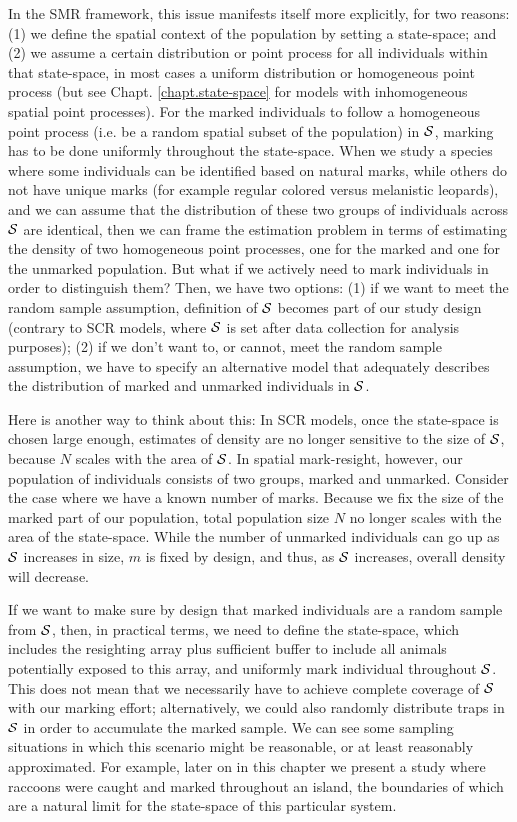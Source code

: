 In the SMR framework, this issue manifests itself more explicitly, for
two reasons: (1) we define the spatial context of the population by
setting a state-space; and (2) we assume a certain distribution or
point process for all individuals within that state-space, in most
cases a uniform distribution or homogeneous point process (but see
Chapt. \ref{chapt.state-space} for models with inhomogeneous spatial
point processes). For the marked individuals to follow a homogeneous point process (i.e. be a random spatial
subset 
of the population) in ${\cal S}$, marking has to be done uniformly throughout the state-space. 
When we study a species where some
individuals can be identified based on natural marks, while others do
not have unique marks (for example regular colored versus melanistic
leopards), and we can assume that the distribution of these two groups
of individuals across ${\cal S}$ are identical, then we can frame the
estimation problem in terms of estimating the density of two
homogeneous point processes, one for the marked and one for the unmarked
population.
But what if we actively need to mark
individuals in order to distinguish them?  Then, we have two options: (1) if we want to meet
the random sample assumption, definition of ${\cal S}$ becomes
part of our study design (contrary to SCR models, where ${\cal S}$ is set after data collection for analysis
purposes); (2) if we don't want to, or cannot, meet the random sample assumption, we have to specify an alternative model that adequately describes the distribution of marked and unmarked individuals in ${\cal S}$.

Here is another way to think about this: In SCR models, once the
state-space is chosen large enough, estimates of density are no longer
sensitive to the size of ${\cal S}$, because $N$ scales with the area
of ${\cal S}$. In spatial mark-resight, however, our population of
individuals consists of two groups, marked and unmarked. Consider the
case where we have a known number of marks. Because we fix the size of
the marked part of our population, total population size $N$ no longer
scales with the area of the state-space. While the number of unmarked
individuals can go up as ${\cal S}$ increases in size, $m$ is fixed by
design, and thus, as ${\cal S}$ increases, overall density will
decrease. 

If we want to make sure by design that marked individuals are a
random sample from ${\cal S}$, then, in practical terms, we need to
define the state-space, which includes the resighting array plus
sufficient buffer to include all animals potentially exposed to this
array, and uniformly mark individual throughout ${\cal S}$. This does not mean that we necessarily have to achieve complete coverage of ${\cal S}$ with our marking effort; alternatively, we could also randomly distribute traps in ${\cal S}$ in order to accumulate the marked
sample.
We can see some sampling situations in which this
scenario might be reasonable, or at least reasonably
approximated. For example, later on in this chapter we present a study
where raccoons were caught and marked throughout an island, the
boundaries of which are a natural limit for the state-space of this
particular system. 


